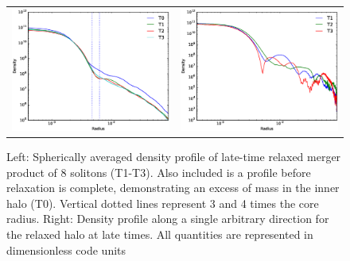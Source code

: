 \documentclass[a4paper,11pt]{article}
\begin{document}

\begin{figure}
\begin{tabular}{cc}
{\includegraphics[scale = 0.42, trim={1.5cm 0 0 1cm}]{pics/M_combined_2.eps}} &
{\includegraphics[scale = 0.42, trim={2.5cm 0 0 1cm}]{pics/M_singles_1.eps}}
\end{tabular}
\caption{Left: Spherically averaged density profile of late-time relaxed merger product of 8 solitons (T1-T3). Also included is a profile before relaxation is complete, demonstrating an excess of mass in the inner halo (T0). Vertical dotted lines represent 3 and 4 times the core radius.
Right: Density profile along a single arbitrary direction for the relaxed halo at late times. All quantities are represented in dimensionless code units}\label{fig:pul}
\end{figure}
\end{document}
